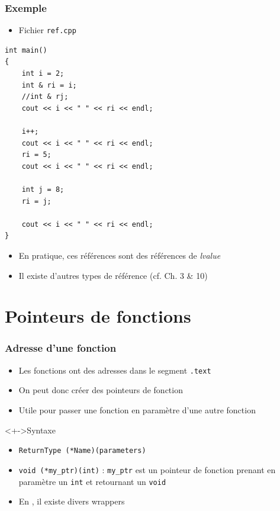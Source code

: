 \begin{frame}[containsverbatim]
\frametitle{Exemple}
\begin{itemize}
\item Fichier \texttt{ref.cpp}
\end{itemize}
\begin{lstlisting}
int main()
{
	int i = 2;
	int & ri = i;
	//int & rj;
	cout << i << " " << ri << endl;	

	i++;
	cout << i << " " << ri << endl;
	ri = 5;
	cout << i << " " << ri << endl;

	int j = 8;
	ri = j;

	cout << i << " " << ri << endl;
}
\end{lstlisting}
\begin{itemize}
\item En pratique, ces références sont des références de \emph{lvalue}
\item Il existe d'autres types de référence (cf. Ch. 3 \& 10)
\end{itemize}
\end{frame}

\section{Pointeurs de fonctions}

\begin{frame}
\frametitle{Adresse d'une fonction}
\begin{itemize}[<+->]
\item Les fonctions ont des adresses dans le segment \texttt{.text}
\item On peut donc créer des pointeurs de fonction
\item Utile pour passer une fonction en paramètre d'une autre fonction
\end{itemize}
\begin{exampleblock}<+->{Syntaxe}
	\begin{itemize}[<+->]
	\item \texttt{ReturnType (*Name)(parameters)}
	\item \lstinline|void (*my_ptr)(int)| : \texttt{my\_ptr} est un pointeur de fonction prenant en paramètre un \lstinline|int| et retournant un \lstinline|void|
	\end{itemize}
\end{exampleblock}
\begin{itemize}[<+->]
\item En \cpp, il existe divers wrappers
\end{itemize}
\end{frame}

